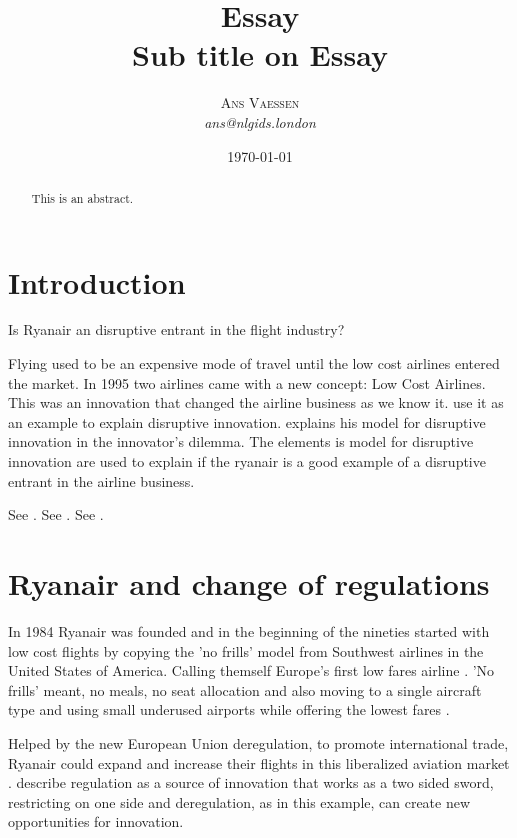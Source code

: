 \documentclass[a4paper, 11pt]{article}
\title{\textbf{Essay}\\Sub title on Essay}
\author{\textsc{Ans Vaessen}
\\{\textit{ans@nlgids.london}}}
\date{\today}
\begin{document}
\maketitle

\begin{abstract}
This is an abstract.
\end{abstract}

\vspace{30pt} %

\section*{Introduction}
Is Ryanair an disruptive entrant in the flight industry?


Flying used to be an expensive mode of travel until the low cost airlines entered the market. In 1995 two airlines came with a new concept: Low Cost Airlines. This was an innovation that changed the airline business as we know it. \cite{TiddBessant} use it as an example to explain disruptive innovation. \citep{Christensen97} explains his model for disruptive innovation in the innovator's dilemma. The elements is model for disruptive innovation are used to explain if the ryanair is a good example of a disruptive entrant in the airline business.


See \cite{Christensen97}.
See \citep{Christensen97}.
See \citep[p. 145]{Christensen97}.

\section{Ryanair and change of regulations}

In 1984 Ryanair was founded and in the beginning of the nineties started with low cost flights by copying the 'no frills' model from Southwest airlines in the United States of America. Calling themself Europe’s first low fares airline \cite{Ryanair}. 'No frills' meant, no meals, no seat allocation and also moving to a single aircraft type and using small underused airports while offering the lowest fares \citep{Diaconu}.

Helped by the new European Union deregulation, to promote international trade, Ryanair could expand and increase their flights in this liberalized aviation market \citep{Diaconu}. \cite{TiddBessant} describe regulation as a source of innovation that works as a two sided sword, restricting on one side and deregulation, as in this example, can create new opportunities for innovation.
\end{document}
